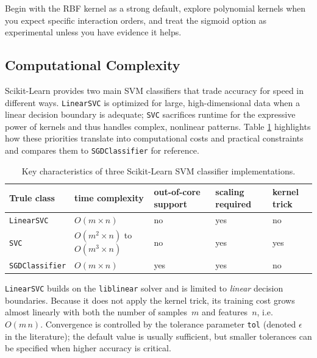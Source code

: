 \documentclass[12pt,letter]{article}
\begin{document}
\begin{mdframed}[middlelinewidth=0.5mm]
\begin{center}
\end{center}
Begin with the RBF kernel as a strong default, explore polynomial kernels when you expect specific interaction orders, and treat the sigmoid option as experimental unless you have evidence it helps.
\end{mdframed}

\subsection{Computational Complexity}

Scikit-Learn provides two main SVM classifiers that trade accuracy for speed in different ways.  
\texttt{LinearSVC} is optimized for large, high-dimensional data when a linear decision boundary is adequate; \texttt{SVC} sacrifices runtime for the expressive power of kernels and thus handles complex, nonlinear patterns. Table \ref{table:SVM_classifiers} highlights how these priorities translate into computational costs and practical constraints and compares them to \texttt{SGDClassifier} for reference.

\begin{table}[H]
\caption{Key characteristics of three Scikit-Learn SVM classifier implementations.}
\label{table:SVM_classifiers}
\begin{tabular}{@{}lllll@{}}
Trule
class & time complexity & out-of-core support & scaling required & kernel trick \\ \midrule
\texttt{LinearSVC} & $O(m \times n)$ & no & yes & no \\
\texttt{SVC} & $O(m^2 \times n)$ to $O(m^3 \times n)$ & no & yes & yes \\
\texttt{SGDClassifier} & $O(m \times n)$ & yes & yes & no \\ \bottomrule
\end{tabular}
\end{table}


\texttt{LinearSVC} builds on the \texttt{liblinear} solver and is limited to \emph{linear} decision boundaries.  
Because it does not apply the kernel trick, its training cost grows almost linearly with both the number of samples~\(m\) and features~\(n\), i.e.\ \(O(m\,n)\). Convergence is controlled by the tolerance parameter \texttt{tol} (denoted \(\epsilon\) in the literature); the default value is usually sufficient, but smaller tolerances can be specified when higher accuracy is critical.
\end{document}
